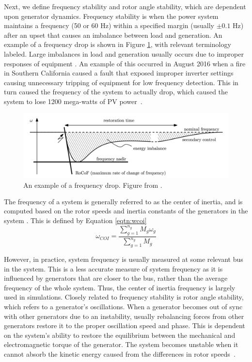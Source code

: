 Next, we define frequency stability and rotor angle stability, which are dependent upon generator dynamics.  Frequency stability is when the power system maintains a frequency (50 or 60 Hz) within a specified margin (usually $\pm 0.1$ Hz) after an upset that causes an imbalance between load and generation.  An example of a frequency drop is shown in Figure \ref{fig:frequency}, with relevant terminology labeled.  Large imbalances in load and generation usually occurs due to improper responses of equipment \cite{kundur}.  An example of this occurred in August 2016 when a fire in Southern California caused a fault that exposed improper inverter settings causing unnecessary tripping of equipment for low frequency detection.  This in turn caused the frequency of the system to actually drop, which caused the system to lose 1200 mega-watts of PV power~\cite{nerc_inv}.  
\begin{figure}
\begin{center}
\includegraphics[width=\textwidth]{figures/frequency}	
\caption{An example of a frequency drop. Figure from \cite{Gross}.}
\label{fig:frequency}
\end{center}
\end{figure}
The frequency of a system is generally referred to as the center of inertia, and is computed based on the rotor speeds and inertia constants of the generators in the system \cite{dorfler_inertia}.  This is defined by Equation \ref{eqtn:wcoi}
\begin{equation}
\label{eqtn:wcoi}
\omega_{COI} = \frac{\sum\limits_{g=1}^{n_g} M_g \omega_g}{	\sum\limits_{g=1}^{n_g} M_g}
\end{equation}


However, in practice, system frequency is usually measured at some relevant bus in the system.  This is a less accurate measure of system frequency as it is influenced by generators that are closer to the bus, rather than the average frequency of the whole system.  Thus, the center of inertia frequency is largely used in simulations.    Closely related to frequency stability is rotor angle stability, which refers to a generator's oscillations.  When a generator becomes out of sync with other generators due to an instability, usually rebalancing forces from other generators restore it to the proper oscillation speed and phase.  This is dependent on the system's ability to restore the equilibrium between the mechanical and electromagnetic torque of the generator.  The system becomes unstable when it cannot absorb the kinetic energy caused from the differences in rotor speeds~\cite{def_stability}.  


